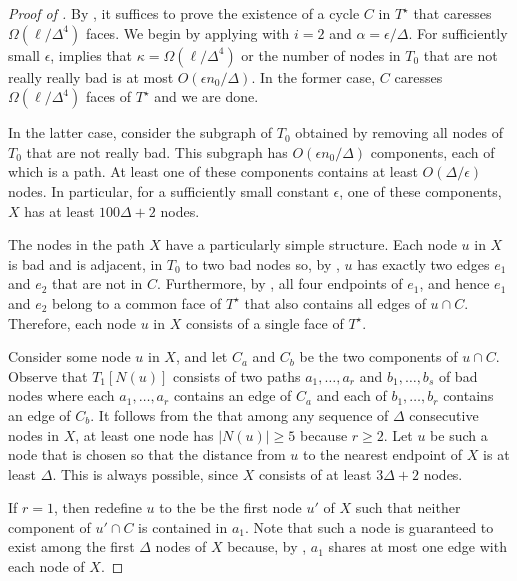 \documentclass{patmorin}
\newcommand{\dual}[1]{{#1}^\star}
\begin{document}
\begin{proof}[Proof of ]
By , it suffices to prove the existence of
a cycle $C$ in $\dual{T}$ that caresses $\Omega(\ell/\Delta^4)$
faces.  We begin by applying  with
$i=2$ and $\alpha = \epsilon/\Delta$.  For sufficiently small
$\epsilon$,  implies that $\kappa =
\Omega(\ell/\Delta^4)$ or the number of nodes in $T_0$ that are not really
really bad is at most $O(\epsilon n_0/\Delta)$.  In the former case,
$C$ caresses $\Omega(\ell/\Delta^4)$ faces of $\dual{T}$ and we are done.

In the latter case, consider the subgraph of $T_0$ obtained by
removing all nodes of $T_0$ that are not really bad.  This subgraph has
$O(\epsilon n_0/\Delta)$ components, each of which is a path.  At least one of
these components contains at least $O(\Delta/\epsilon)$ nodes. In particular,
for a sufficiently small constant $\epsilon$, one of these components,
$X$ has at least $100\Delta+2$ nodes.

The nodes in the path $X$ have a particularly simple structure. Each
node $u$ in $X$ is bad and is adjacent, in $T_0$ to two bad nodes so,
by , $u$ has exactly two edges $e_1$ and $e_2$
that are not in $C$.  Furthermore, by , all four
endpoints of $e_1$, and hence $e_1$ and $e_2$ belong to a common face
of $\dual{T}$ that also contains all edges of $u\cap C$.  Therefore,
each node $u$ in $X$ consists of a single face of $\dual{T}$.

Consider some node $u$ in $X$, and let $C_a$ and $C_b$ be the two
components of $u\cap C$. Observe that $T_1[N(u)]$ consists of two
paths $a_1,\ldots,a_r$ and $b_1,\ldots,b_s$ of bad nodes where each
$a_1,\ldots,a_r$ contains an edge of $C_a$ and each of $b_1,\ldots,b_r$
contains an edge of $C_b$.  It follows from the 
that among any sequence of $\Delta$ consecutive nodes in $X$, at least
one node has $|N(u)|\ge 5$ because $r\ge 2$.  Let $u$ be such a node that
is chosen so that the distance from $u$ to the nearest endpoint of $X$
is at least $\Delta$.  This is always possible, since $X$ consists of
at least $3\Delta+2$ nodes.





If $r=1$, then redefine $u$ to the be the
first node $u'$ of $X$ such that neither component of $u'\cap C$ is
contained in $a_1$.  Note that such a node is guaranteed to exist among
the first $\Delta$ nodes of $X$ because, by ,
$a_1$ shares at most one edge with each node of $X$.




\end{proof}
\end{document}
